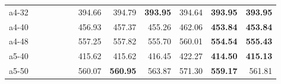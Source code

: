 \documentclass[aspectratio=1610]{beamer}
\begin{document}
\begin{frame}
\begin{table}[]
{\begin{tabular}{lrrrrrrrrrrr}
a4-32                                          &                                                         & \multicolumn{1}{r|}{}                &                                                              & \textbf{}       & \multicolumn{1}{r|}{}                                       & 394.66              & \multicolumn{1}{r|}{394.79}                                    & \textbf{393.95}   & \multicolumn{1}{r|}{394.64}                                  & \textbf{393.95}               & {\color[HTML]{FE0000} \textbf{393.95}}               \\
a4-40                                          &                                                         & \multicolumn{1}{r|}{}                &                                                              &                 & \multicolumn{1}{r|}{}                                       & 456.93              & \multicolumn{1}{r|}{457.37}                                    & 455.26            & \multicolumn{1}{r|}{462.06}                                  & \textbf{453.84}               & {\color[HTML]{FE0000} \textbf{453.84}}               \\
a4-48                                          &                                                         & \multicolumn{1}{r|}{}                &                                                              &                 & \multicolumn{1}{r|}{}                                       & 557.25              & \multicolumn{1}{r|}{557.82}                                    & 555.70            & \multicolumn{1}{r|}{560.01}                                  & \textbf{554.54}               & {\color[HTML]{FE0000} \textbf{555.43}}               \\
a5-40                                          &                                                         & \multicolumn{1}{r|}{}                &                                                              &                 & \multicolumn{1}{r|}{}                                       & 415.62              & \multicolumn{1}{r|}{415.62}                                    & 416.45            & \multicolumn{1}{r|}{422.27}                                  & \textbf{414.50}               & {\color[HTML]{FE0000} \textbf{415.13}}               \\
a5-50                                          &                                                         & \multicolumn{1}{r|}{}                &                                                              &                 & \multicolumn{1}{r|}{}                                       & 560.07              & \multicolumn{1}{r|}{{\color[HTML]{FE0000} \textbf{560.95}}}    & 563.87            & \multicolumn{1}{r|}{571.30}                                  & \textbf{559.17}               & 561.81                                               \\ \hline
\end{tabular}%
}
\end{table}

\end{frame}
\end{document}
